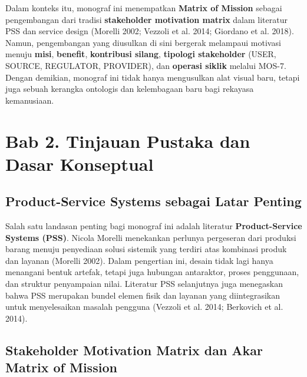 \documentclass[
  letterpaper,
  DIV=11,
  numbers=noendperiod]{scrreprt}
\begin{document}
Dalam konteks itu, monograf ini menempatkan \textbf{Matrix of Mission}
sebagai pengembangan dari tradisi \textbf{stakeholder motivation matrix}
dalam literatur PSS dan service design (Morelli 2002; Vezzoli et al.
2014; Giordano et al. 2018). Namun, pengembangan yang diusulkan di sini
bergerak melampaui motivasi menuju \textbf{misi}, \textbf{benefit},
\textbf{kontribusi silang}, \textbf{tipologi stakeholder} (USER, SOURCE,
REGULATOR, PROVIDER), dan \textbf{operasi siklik} melalui MOS-7. Dengan
demikian, monograf ini tidak hanya mengusulkan alat visual baru, tetapi
juga sebuah kerangka ontologis dan kelembagaan baru bagi rekayasa
kemanusiaan.


\chapter*{Bab 2. Tinjauan Pustaka dan Dasar
Konseptual}\label{bab-2.-tinjauan-pustaka-dan-dasar-konseptual}


\section*{Product-Service Systems sebagai Latar
Penting}\label{product-service-systems-sebagai-latar-penting}


Salah satu landasan penting bagi monograf ini adalah literatur
\textbf{Product-Service Systems (PSS)}. Nicola Morelli menekankan
perlunya pergeseran dari produksi barang menuju penyediaan solusi
sistemik yang terdiri atas kombinasi produk dan layanan (Morelli 2002).
Dalam pengertian ini, desain tidak lagi hanya menangani bentuk artefak,
tetapi juga hubungan antaraktor, proses penggunaan, dan struktur
penyampaian nilai. Literatur PSS selanjutnya juga menegaskan bahwa PSS
merupakan bundel elemen fisik dan layanan yang diintegrasikan untuk
menyelesaikan masalah pengguna (Vezzoli et al. 2014; Berkovich et al.
2014).

\section*{Stakeholder Motivation Matrix dan Akar Matrix of
Mission}\label{stakeholder-motivation-matrix-dan-akar-matrix-of-mission}
\end{document}
